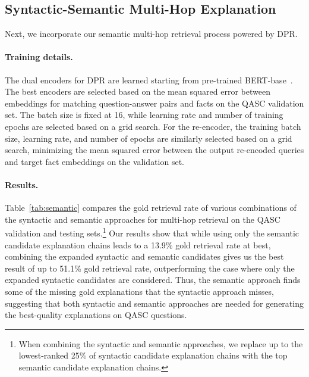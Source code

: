 \documentclass[letterpaper]{article} %
\begin{document}
\subsection{Syntactic-Semantic Multi-Hop Explanation}
Next, we incorporate our semantic multi-hop retrieval process powered by DPR. 

\paragraph{Training details.}
The dual encoders for DPR are learned starting from pre-trained \textsc{BERT}-base~\cite{devlin-etal-2019-bert}. The best encoders are selected based on the mean squared error between embeddings for matching question-answer pairs and facts on the QASC validation set. The batch size is fixed at 16, while learning rate and number of training epochs are selected based on a grid search. 
For the re-encoder, the training batch size, learning rate, and number of epochs are similarly selected based on a grid search, minimizing the mean squared error between the output re-encoded queries and target fact embeddings on the validation set. 

\paragraph{Results.}
Table~\ref{tab:semantic} compares the gold retrieval rate of various combinations of the syntactic and semantic approaches for multi-hop retrieval on the QASC validation and testing sets.\footnote{When combining the syntactic and semantic approaches, we replace up to the lowest-ranked 25\% of syntactic candidate explanation chains with the top semantic candidate explanation chains.} Our results show that while using only the semantic candidate explanation chains leads to a 13.9\% gold retrieval rate at best, combining the expanded syntactic and semantic candidates gives us the best result of up to 51.1\% gold retrieval rate, outperforming the case where only the expanded syntactic candidates are considered. Thus, the semantic approach finds some of the missing gold explanations that the syntactic approach misses, suggesting that both syntactic and semantic approaches are needed for generating the best-quality explanations on QASC questions.
\end{document}
